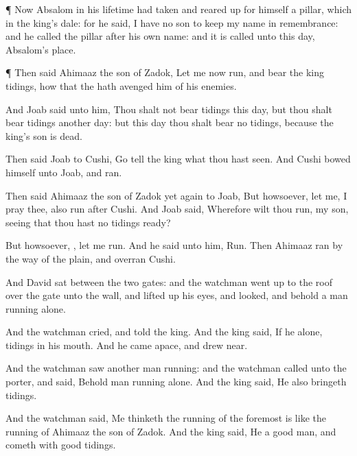 {\par }{\PP {}¶ Now
Absalom in his
lifetime had
taken and reared
up for himself a
pillar, which
{} in the
king’s
dale: for he
said, I have no
son to keep my
name in
remembrance: and he
called the
pillar after his own
name: and it is
called unto this
day,
Absalom’s
place.


\par }{\PP {}¶ Then
said
Ahimaaz the
son of
Zadok, Let me now
run, and
bear the
king
tidings, how that the
{} hath
avenged him of his
enemies.

And
Joab
said unto him,
Thou shalt not bear
tidings this
day, but thou shalt bear
tidings
another
day: but this
day thou shalt bear no
tidings, because the
king’s
son is
dead.

Then
said
Joab to
Cushi,
Go
tell the
king what thou hast
seen. And
Cushi
bowed himself unto
Joab, and
ran.

Then
said
Ahimaaz the
son of
Zadok yet
again to
Joab, But
howsoever, let me, I pray thee, also
run
after
Cushi. And
Joab
said, Wherefore wilt thou
run, my
son, seeing that thou hast no
tidings
ready?

But howsoever,
{}, let me
run. And he
said unto him,
Run. Then
Ahimaaz
ran by the
way of the
plain, and
overran
Cushi.

And
David
sat between the
two
gates: and the
watchman went
up to the
roof over the
gate unto the
wall, and lifted
up his
eyes, and
looked, and behold a
man
running alone.

And the
watchman
cried, and
told the
king. And the
king
said, If he
{} alone,
{}
tidings in his
mouth. And he
came
apace, and drew
near.

And the
watchman
saw
another
man
running: and the
watchman
called unto the
porter, and
said, Behold
{}
man
running alone. And the
king
said, He also bringeth
tidings.

And the
watchman
said, Me
thinketh the
running of the
foremost is like the
running of
Ahimaaz the
son of
Zadok. And the
king
said, He
{} a
good
man, and
cometh with
good
tidings.

}
